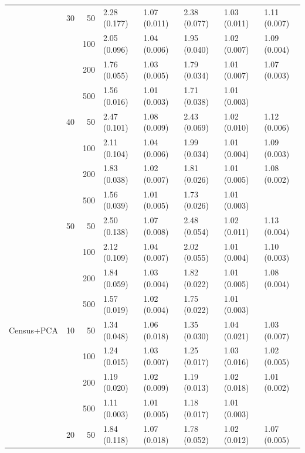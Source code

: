 \begin{longtable}{p{}lrlllll}
      & 30  & 50  &   2.28 (0.177) &   1.07 (0.011) &   2.38 (0.077) &         1.03 (0.011) &  1.11 (0.007) \\
      &     & 100 &   2.05 (0.096) &   1.04 (0.006) &   1.95 (0.040) &         1.02 (0.007) &  1.09 (0.004) \\
      &     & 200 &   1.76 (0.055) &   1.03 (0.005) &   1.79 (0.034) &         1.01 (0.007) &  1.07 (0.003) \\
      &     & 500 &   1.56 (0.016) &   1.01 (0.003) &   1.71 (0.038) &         1.01 (0.003) &            \\
      & 40  & 50  &   2.47 (0.101) &   1.08 (0.009) &   2.43 (0.069) &         1.02 (0.010) &  1.12 (0.006) \\
      &     & 100 &   2.11 (0.104) &   1.04 (0.006) &   1.99 (0.034) &         1.01 (0.004) &  1.09 (0.003) \\
      &     & 200 &   1.83 (0.038) &   1.02 (0.007) &   1.81 (0.026) &         1.01 (0.005) &  1.08 (0.002) \\
      &     & 500 &   1.56 (0.039) &   1.01 (0.005) &   1.73 (0.026) &         1.01 (0.003) &            \\
      & 50  & 50  &   2.50 (0.138) &   1.07 (0.008) &   2.48 (0.054) &         1.02 (0.011) &  1.13 (0.004) \\
      &     & 100 &   2.12 (0.109) &   1.04 (0.007) &   2.02 (0.055) &         1.01 (0.004) &  1.10 (0.003) \\
      &     & 200 &   1.84 (0.059) &   1.03 (0.004) &   1.82 (0.022) &         1.01 (0.005) &  1.08 (0.004) \\
      &     & 500 &   1.57 (0.019) &   1.02 (0.004) &   1.75 (0.022) &         1.01 (0.003) &            \\
\midrule
Census+PCA & 10  & 50  &   1.34 (0.048) &   1.06 (0.018) &   1.35 (0.030) &         1.04 (0.021) &  1.03 (0.007) \\
      &     & 100 &   1.24 (0.015) &   1.03 (0.007) &   1.25 (0.017) &         1.03 (0.016) &  1.02 (0.005) \\
      &     & 200 &   1.19 (0.020) &   1.02 (0.009) &   1.19 (0.013) &         1.02 (0.018) &  1.01 (0.002) \\
      &     & 500 &   1.11 (0.003) &   1.01 (0.005) &   1.18 (0.017) &         1.01 (0.003) &            \\
      & 20  & 50  &   1.84 (0.118) &   1.07 (0.018) &   1.78 (0.052) &         1.02 (0.012) &  1.07 (0.005) \\

\end{longtable}
